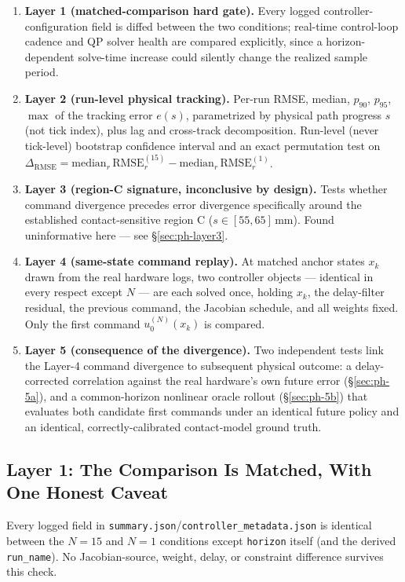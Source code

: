 \documentclass[journal]{IEEEtran}
\begin{document}
\begin{enumerate}
\item \textbf{Layer 1 (matched-comparison hard gate).} Every logged
  controller-configuration field is diffed between the two
  conditions; real-time control-loop cadence and QP solver health are
  compared explicitly, since a horizon-dependent solve-time increase
  could silently change the realized sample period.
\item \textbf{Layer 2 (run-level physical tracking).} Per-run RMSE, median,
  $p_{90}$, $p_{95}$, $\max$ of the tracking error $e(s)$, parametrized
  by physical path progress $s$ (not tick index), plus lag and
  cross-track decomposition. Run-level (never tick-level) bootstrap
  confidence interval and an exact permutation test on
  $\Delta_{\mathrm{RMSE}} = \mathrm{median}_r\,\mathrm{RMSE}_r^{(15)} -
  \mathrm{median}_r\,\mathrm{RMSE}_r^{(1)}$.
\item \textbf{Layer 3 (region-C signature, inconclusive by design).} Tests
  whether command divergence precedes error divergence specifically
  around the established contact-sensitive region C
  ($s\in[55,65]\,\mathrm{mm}$). Found uninformative here --- see
  \S\ref{sec:ph-layer3}.
\item \textbf{Layer 4 (same-state command replay).} At matched anchor
  states $x_k$ drawn from the real hardware logs, two controller
  objects --- identical in every respect except $N$ --- are each
  solved once, holding $x_k$, the delay-filter residual, the previous
  command, the Jacobian schedule, and all weights fixed. Only the
  first command $u_0^{(N)}(x_k)$ is compared.
\item \textbf{Layer 5 (consequence of the divergence).} Two independent
  tests link the Layer-4 command divergence to subsequent physical
  outcome: a delay-corrected correlation against the real hardware's
  own future error (\S\ref{sec:ph-5a}), and a common-horizon nonlinear
  oracle rollout (\S\ref{sec:ph-5b}) that evaluates both candidate
  first commands under an identical future policy and an identical,
  correctly-calibrated contact-model ground truth.
\end{enumerate}

\subsection{Layer 1: The Comparison Is Matched, With One Honest Caveat}
\label{sec:ph-layer1}

Every logged field in \texttt{summary.json}/\texttt{controller\_metadata.json}
is identical between the $N{=}15$ and $N{=}1$ conditions except
\texttt{horizon} itself (and the derived \texttt{run\_name}). No
Jacobian-source, weight, delay, or constraint difference survives this
check.
\end{document}
